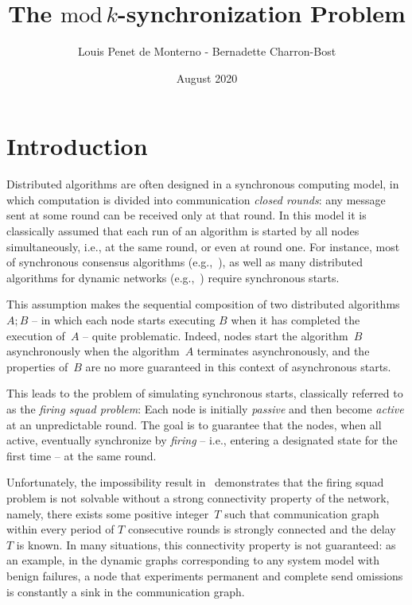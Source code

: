 \documentclass{article}
\title{The $\mathrm{mod}\,k$-synchronization Problem}
\date{August 2020}
\author{Louis Penet de Monterno - Bernadette Charron-Bost}
\begin{document}
\maketitle
\tableofcontents

\section{Introduction}

Distributed algorithms are often designed in a synchronous computing model, in which computation
	is divided into communication {\em closed rounds}:
	any message  sent at some round  can be received only at that round.
In this model it is classically assumed that each run of an algorithm is started by all nodes simultaneously, i.e., at the same round,
	or even at round one.
For instance, most of synchronous consensus algorithms
	(e.g.,~\cite{PSL80,DS83,ST87}), as well as many distributed algorithms for dynamic networks (e.g.,~\cite{KLO10,KMO11})
	require synchronous starts.

This assumption makes the sequential composition of two distributed algorithms $A;B$
	-- in which each node starts executing $B$ when it has completed the execution of~$A$ --
	quite problematic.
Indeed, nodes start the algorithm~$B$ asynchronously when the algorithm~$A$ terminates asynchronously,
	and the properties of~$B$ are no more guaranteed in this context of asynchronous starts.

This leads to the problem of simulating synchronous starts, classically referred to as
	the {\em firing squad problem}:
Each node is  initially  {\em passive} and then become {\em active}  at an unpredictable round.
The goal is to guarantee that   the nodes, when all active, eventually synchronize
	by {\em firing} -- i.e., entering a designated state for the first time -- at the same round.

Unfortunately, the impossibility result in~\cite{CBM18} demonstrates that the firing squad problem
	is not solvable without a strong connectivity property of the network, namely, there exists  some positive
	integer~$T$ such that communication graph within  every period of $T$ consecutive
	rounds is strongly connected and the delay~$T$ is known.
In many situations,  this connectivity property is not guaranteed:
	as an example, in the dynamic graphs corresponding to any system model with benign failures,
	a node  that experiments permanent and complete send omissions
	is  constantly a sink in the  communication graph.
\end{document}
